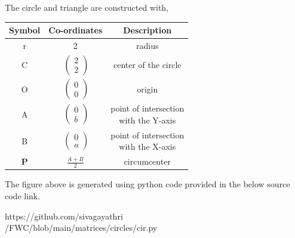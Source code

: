 \documentclass[a4paper,10pt]{report}
\begin{document}
\begin{multicols}{2}
\raggedright\large{The circle and triangle are constructed with,} 
\begin{center}
    \label{tab:truthtable}
    \setlength{\arrayrulewidth}{0.2mm}
\setlength{\tabcolsep}{5pt}
\renewcommand{\arraystretch}{1.25}
    \begin{tabular}{|c|c|c|}
    \hline %
      \large\textbf{Symbol} & \large\textbf{Co-ordinates} & \large\textbf{Description}\\
      \hline
       \large r& 2 & \large{radius}\\
       \large C & $\ \begin{pmatrix} 2\\ 2 \end{pmatrix}$ & center of the circle \\
       \large O & $\ \begin{pmatrix} 0\\ 0 \end{pmatrix}$ & origin\\
	
	\large A & $\ \begin{pmatrix} 0\\ b \end{pmatrix}$ &\makecell {point of intersection \\ with the Y-axis } \\
	\large B & $\ \begin{pmatrix} 0\\ a \end{pmatrix}$ &\makecell {point of intersection \\ with the X-axis}\\
	\large \textbf P & $\frac{A+B}{2} $ & circumcenter\\
      \hline
   \end{tabular}
 \end{center}\vspace{5mm}
\raggedright\large{The figure above is generated using python code provided in the below source code link.}\vspace{2mm}\\
\begin{mdframed}
\raggedright\large{https://github.com/sivagayathri \\ /FWC/blob/main/matrices/circles/cir.py}
\end{mdframed}
\end{multicols}
\end{document}
